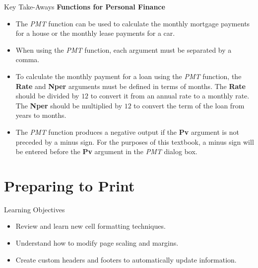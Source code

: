 \begin{center}
	\begin{tkwbox}{Key Take-Aways}
		\textbf{Functions for Personal Finance}
		\\
		\begin{itemize}
			\setlength{\itemsep}{0pt}
			\setlength{\parskip}{0pt}
			\setlength{\parsep}{0pt}
			
			\item The \textit{PMT} function can be used to calculate the monthly mortgage payments for a house or the monthly lease payments for a car.
			\item When using the \textit{PMT} function, each argument must be separated by a comma.
			\item To calculate the monthly payment for a loan using the \textit{PMT} function, the \textbf{Rate} and \textbf{Nper} arguments must be defined in terms of months. The \textbf{Rate} should be divided by $ 12 $ to convert it from an annual rate to a monthly rate. The \textbf{Nper} should be multiplied by $ 12 $ to convert the term of the loan from years to months.
			\item The \textit{PMT} function produces a negative output if the \textbf{Pv} argument is not preceded by a minus sign. For the purposes of this textbook, a minus sign will be entered before the \textbf{Pv} argument in the \textit{PMT} dialog box.
			
		\end{itemize}
	\end{tkwbox}
\end{center}

\section{Preparing to Print}\label{ch02:preparing_to_print}

\begin{center}
	\begin{objbox}{Learning Objectives}
		\begin{itemize}
			\setlength{\itemsep}{0pt}
			\setlength{\parskip}{0pt}
			\setlength{\parsep}{0pt}
			
			\item Review and learn new cell formatting techniques.
			\item Understand how to modify page scaling and margins.
			\item Create custom headers and footers to automatically update information.

		\end{itemize}
	\end{objbox}
\end{center}


